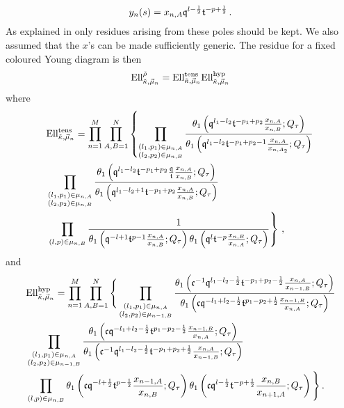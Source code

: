 \documentclass[main.tex]{subfiles}
\begin{document}
\begin{equation}\label{eqn:polekeep}
y_n(s)=x_{n,A}\mathfrak{q}^{l-\frac{1}{2}}\mathfrak{t}^{-p+\frac{1}{2}}\,.
\end{equation}
As explained in \cite{Kim:2011mv,Kim:2012gu} only residues arising from these poles should be kept. We also assumed that the $x$'s can be made sufficiently generic. The residue for a fixed coloured Young diagram is then 
\begin{equation}\label{eqn:Mstringyng}
\textrm{Ell}^{\tilde{\rho}}_{\tilde{\kappa},\vec{\mu}_n}=\textrm{Ell}_{\tilde{\kappa},\vec{\mu}_n}^{\text{tens}}\textrm{Ell}_{\tilde{\kappa},\vec{\mu}_n}^{\text{hyp}}
\end{equation}
where
\begin{equation}
\begin{aligned}
&\textrm{Ell}_{\tilde{\kappa},\vec{\mu}_n}^{\text{tens}}=\prod_{n=1}^M\prod_{A,B=1}^{N}\left\{\prod_{\substack{(l_1,p_1)\in \mu_{{n,A}}\\(l_2,p_2)\in \mu_{{n,B}}}}\frac{\theta_1\left(\mathfrak{q}^{l_1-l_2}\mathfrak{t}^{-p_1+p_2}\frac{x_{n,A}}{x_{n,B}};Q_{\tau}\right)}{\theta_1\left(\mathfrak{q}^{l_1-l_2}\mathfrak{t}^{-p_1+p_2-1}\frac{x_{n,A}}{x_{n,A_2}};Q_{\tau}\right)}\right.\\
&\prod_{\substack{(l_1,p_1)\in \mu_{{n,A}}\\(l_2,p_2)\in \mu_{{n,B}}}}\frac{\theta_1\left(\mathfrak{q}^{l_1-l_2}\mathfrak{t}^{-p_1+p_2}\frac{\mathfrak{q}}{\mathfrak{t}}\frac{x_{n,A}}{x_{n,B}};Q_{\tau}\right)}{\theta_1\left(\mathfrak{q}^{l_1-l_2+1}\mathfrak{t}^{-p_1+p_2}\frac{x_{n,A}}{x_{n,B}};Q_{\tau}\right)}\\
&\left.\prod_{(l,p)\in \mu_{n,B}}\frac{1}{\theta_1\left(\mathfrak{q}^{-l+1}\mathfrak{t}^{p-1}\frac{x_{n,A}}{x_{n,B}};Q_{\tau}\right)\theta_1\left(\mathfrak{q}^{l}\mathfrak{t}^{-p}\frac{x_{n,B}}{x_{n,A}};Q_{\tau}\right)}\right\}\,,
\end{aligned}
\end{equation}
and
\begin{equation}
\begin{aligned}
&\textrm{Ell}_{\tilde{\kappa},\vec{\mu}_n}^{\text{hyp}}=\prod_{n=1}^M\prod_{A,B=1}^{N}\Bigg\{\prod_{\substack{(l_1,p_1)\in \mu_{{n,A}}\\(l_2,p_2)\in \mu_{{n-1,B}}}}\frac{\theta_1\left(\mathfrak{c}^{-1}\mathfrak{q}^{l_1-l_2-\frac{1}{2}}\mathfrak{t}^{-p_1+p_2-\frac{1}{2}}\frac{x_{n,A}}{x_{n-1,B}};Q_{\tau}\right)}{\theta_1\left(\mathfrak{c}\mathfrak{q}^{-l_1+l_2-\frac{1}{2}}\mathfrak{t}^{p_1-p_2+\frac{1}{2}}\frac{x_{n-1,B}}{x_{n,A}};Q_{\tau}\right)}\\
&\prod_{\substack{(l_1,p_1)\in \mu_{{n,A}}\\(l_2,p_2)\in \mu_{{n-1,B}}}}\frac{\theta_1\left(\mathfrak{c}\mathfrak{q}^{-l_1+l_2-\frac{1}{2}}\mathfrak{t}^{p_1-p_2-\frac{1}{2}}\frac{x_{n-1,B}}{x_{n,A}};Q_{\tau}\right)}{\theta_1\left(\mathfrak{c}^{-1}\mathfrak{q}^{l_1-l_2-\frac{1}{2}}\mathfrak{t}^{-p_1+p_2+\frac{1}{2}}\frac{x_{n,A}}{x_{n-1,B}};Q_{\tau}\right)}\\
&\prod_{(l,p)\in \mu_{n,B}}\theta_1\left(\mathfrak{c}\mathfrak{q}^{-l+\frac{1}{2}}\mathfrak{t}^{p-\frac{1}{2}}\frac{x_{n-1,A}}{x_{n,B}};Q_{\tau}\right)\theta_1\left(\mathfrak{c}\mathfrak{q}^{l-\frac{1}{2}}\mathfrak{t}^{-p+\frac{1}{2}}\frac{x_{n,B}}{x_{n+1,A}};Q_{\tau}\right)\Bigg\}\,.
\end{aligned}
\end{equation}
\end{document}

